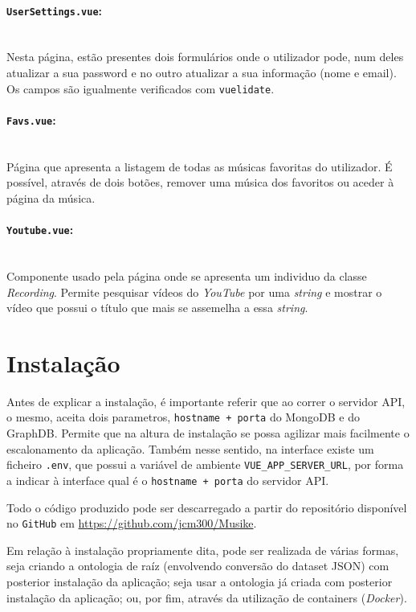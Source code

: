 \documentclass{article}
\begin{document}
\paragraph{\texttt{UserSettings.vue}:}\mbox{}\\

Nesta página, estão presentes dois formulários onde o utilizador pode, num deles atualizar a sua password e no outro atualizar a sua informação (nome e email). Os campos são igualmente verificados com \texttt{vuelidate}.

\paragraph{\texttt{Favs.vue}:}\mbox{}\\

Página que apresenta a listagem de todas as músicas favoritas do utilizador. É possível, através de dois botões, remover uma música dos favoritos ou aceder à página da música.

\paragraph{\texttt{Youtube.vue}:}\mbox{}\\

Componente usado pela página onde se apresenta um individuo da classe \textit{Recording}. Permite pesquisar vídeos do \textit{YouTube} por uma \textit{string} e mostrar o vídeo que possui o título que mais se assemelha a essa \textit{string}.

\section{Instalação}

Antes de explicar a instalação, é importante referir que ao correr o servidor API, o mesmo, aceita dois parametros, \texttt{hostname + porta} do MongoDB e do GraphDB. Permite que na altura de instalação se possa agilizar mais facilmente o escalonamento da aplicação. Também nesse sentido, na interface existe um ficheiro \texttt{.env}, que possui a variável de ambiente \texttt{VUE\_APP\_SERVER\_URL}, por forma a indicar à interface qual é o \texttt{hostname + porta} do servidor API.

Todo o código produzido pode ser descarregado a partir do repositório disponível no \texttt{GitHub} em \url{https://github.com/jcm300/Musike}. 

Em relação à instalação propriamente dita, pode ser realizada de várias formas, seja criando a ontologia de raíz (envolvendo conversão do dataset JSON) com posterior instalação da aplicação; seja usar a ontologia já criada com posterior instalação da aplicação; ou, por fim, através da utilização de containers (\textit{Docker}).
\end{document}
